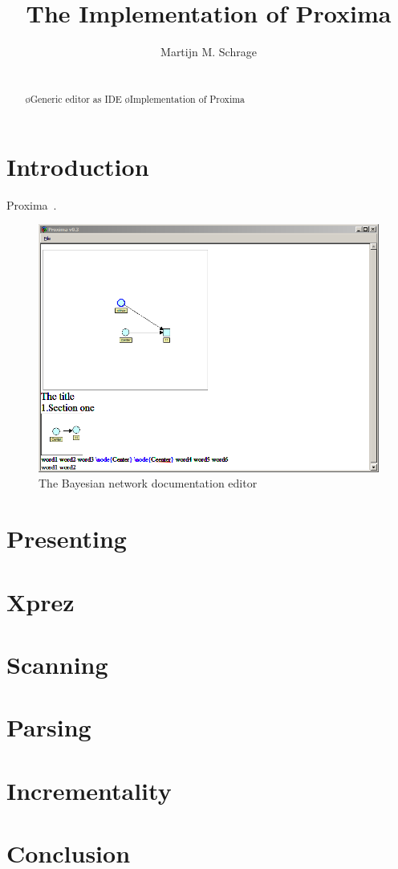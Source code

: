 \documentclass[12pt]{article}
\title{The Implementation of Proxima \\{\small \version}}
\author{Martijn M. Schrage\inst{1}}
\begin{document}
 

\maketitle

\begin{abstract}

~\\ \bl
\o Generic editor as IDE
\o Implementation of Proxima 
\el

\end{abstract}
     


\section{Introduction}
Proxima~\cite{schrage04Proxima}.

\begin{figure}[ht]
\centering
\includegraphics[width=\textwidth]{images/screenshots/BayesDocEditor}
\caption{The Bayesian network documentation editor}
\label{fig:bayesEditor}
\end{figure}

\section{Presenting}
\section{Xprez}
\section{Scanning}
\section{Parsing}
\section{Incrementality}
\section{Conclusion} 






\end{document}
